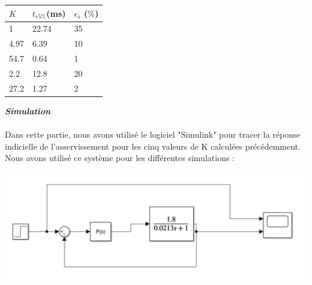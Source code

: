 \documentclass[12pt]{article}
\begin{document}
\begin{center}
    \begin{tabular}{ |p{3cm}|p{3cm}|p{3cm}|}

        \hline
        $K$ & $t_{r5\%}$(ms) & $\epsilon_s$ ($\%$)\\
        \hline
        1 & 22.74 & 35\\
        4.97 & 6.39 & 10\\
        54.7 & 0.64 & 1\\
        2.2& 12.8 & 20\\
        27.2 & 1.27  & 2\\
        
        
        \hline
        \end{tabular}
    \end{center}
\newpage 
\large \textit{ \textbf{Simulation}}
\\\\\normalsize Dans cette partie, nous avons utilisé le logiciel "Simulink" pour tracer la réponse indicielle de l'asservissement pour les cinq valeurs de K calculées précédemment. Nous avons utilisé ce système pour les différentes simulations : 
\begin{center}
    \includegraphics[width = 15 cm]{TP2 Simulink/Syst_1/Syst_1_Simulink_P.png}
\end{center}
\end{document}
